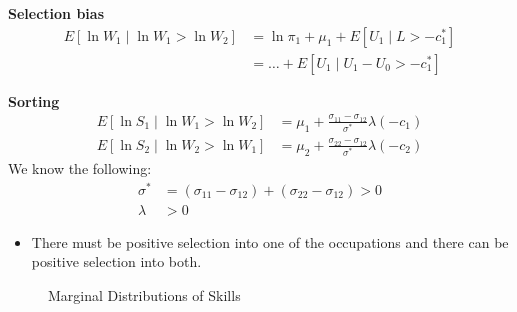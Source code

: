\begin{frame}
	\textbf{Selection bias}
	\begin{align*}
	E[\ln W_1 \mid \ln W_1 > \ln W_2] & = \ln \pi_1 + \mu_1 + E[U_1 \mid L > -c^*_1] \\
									  & = \hdots + E[U_1 \mid U_1 - U_0 > -c^*_1]
	\end{align*}

\end{frame}
\begin{frame}
	\textbf{Sorting}
	\begin{align*}
	E[\ln S_1 \mid \ln W_1 > \ln W_2] & = \mu_1 + \frac{\sigma_{11} - \sigma_{12}}{\sigma^*} \lambda(-c_1) \\
	E[\ln S_2 \mid \ln W_2 > \ln W_1] & = \mu_2 + \frac{\sigma_{22} - \sigma_{12}}{\sigma^*} \lambda(-c_2)
	\end{align*}
	We know the following:
	\begin{align*}
	\sigma^* & = (\sigma_{11} - \sigma_{12}) +  (\sigma_{22} - \sigma_{12}) > 0 \\
	\lambda &> 0
	\end{align*}
	\begin{itemize}\setlength\itemsep{1em}
		\item There must be positive selection into one of the occupations and there can be positive selection into both.
	\end{itemize}
\end{frame}
\begin{frame}
	\begin{figure}[htp]\centering
		\caption{Marginal Distributions of Skills}\label{Marginal Distributions of Skills}
	\end{figure}
\end{frame}
